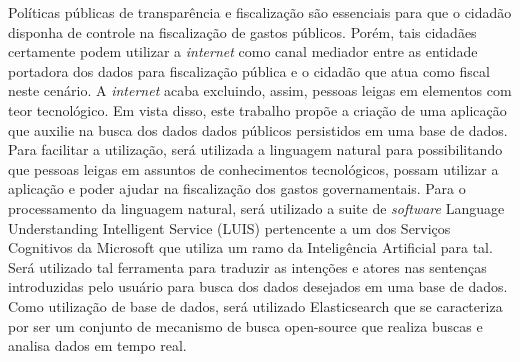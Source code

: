Políticas públicas de transparência e fiscalização são essenciais para que o cidadão disponha de controle na fiscalização de gastos públicos. Porém, tais cidadães certamente podem utilizar a \textit{internet} como canal mediador entre as entidade portadora dos dados para fiscalização pública e o cidadão que atua como fiscal neste cenário. A \textit{internet} acaba excluindo, assim, pessoas leigas em elementos com teor tecnológico.
Em vista disso, este trabalho propõe a criação de uma aplicação que auxilie na busca dos dados dados públicos persistidos em uma base de dados. Para facilitar a utilização, será utilizada a linguagem natural para possibilitando que pessoas leigas em assuntos de conhecimentos tecnológicos, possam utilizar a aplicação e poder ajudar na fiscalização dos gastos governamentais.
Para o processamento da linguagem natural, será utilizado a suite de \textit{software} Language Understanding Intelligent Service (LUIS) pertencente a um dos Serviços Cognitivos da Microsoft que utiliza um ramo da Inteligência Artificial para tal. Será utilizado tal ferramenta para traduzir as intenções e atores nas sentenças introduzidas pelo usuário para busca dos dados desejados em uma base de dados.
Como utilização de base de dados,  será utilizado Elasticsearch que se caracteriza por ser um conjunto de mecanismo de busca open-source que realiza buscas e analisa dados em tempo real.
